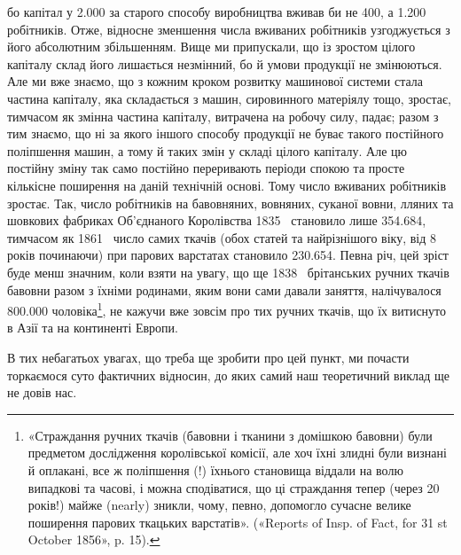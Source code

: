 \parcont{}  %
бо капітал у \num{2.000} за старого способу виробництва
вживав би не 400, а \num{1.200} робітників. Отже, відносне зменшення
числа вживаних робітників узгоджується з його абсолютним
збільшенням. Вище ми припускали, що із зростом цілого
капіталу склад його лишається незмінний, бо й умови продукції
не змінюються. Але ми вже знаємо, що з кожним кроком розвитку
машинової системи стала частина капіталу, яка складається з
машин, сировинного матеріялу тощо, зростає, тимчасом як
змінна частина капіталу, витрачена на робочу силу, падає; разом
з тим знаємо, що ні за якого іншого способу продукції не буває
такого постійного поліпшення машин, а тому й таких змін у
складі цілого капіталу. Але цю постійну зміну так само постійно
переривають періоди спокою та просте кількісне поширення на
даній технічній основі. Тому число вживаних робітників зростає.
Так, число робітників на бавовняних, вовняних, суканої вовни,
лляних та шовкових фабриках Об’єднаного Королівства 1835~
становило лише \num{354.684}, тимчасом як 1861~ число самих ткачів
(обох статей та найрізнішого віку, від 8 років починаючи) при
парових варстатах становило \num{230.654}. Певна річ, цей зріст буде
менш значним, коли взяти на увагу, що ще 1838~ брітанських
ручних ткачів бавовни разом з їхніми родинами, яким вони сами
давали заняття, налічувалося \num{800.000} чоловіка\footnote{
«Страждання ручних ткачів (бавовни і тканини з домішкою
бавовни) були предметом дослідження королівської комісії, але хоч їхні
злидні були визнані й оплакані, все ж поліпшення (!) їхнього становища
віддали на волю випадкові та часові, і можна сподіватися, що ці страждання
тепер (через 20 років!) майже (nearly) зникли, чому, певно, допомогло
сучасне велике поширення парових ткацьких варстатів». («Reports
of Insp. of Fact, for 31 st October 1856», p. 15).
}, не кажучи вже
зовсім про тих ручних ткачів, що їх витиснуто в Азії та на континенті
Европи.

В тих небагатьох увагах, що треба ще зробити про цей пункт,
ми почасти торкаємося суто фактичних відносин, до яких самий
наш теоретичний виклад ще не довів нас.

